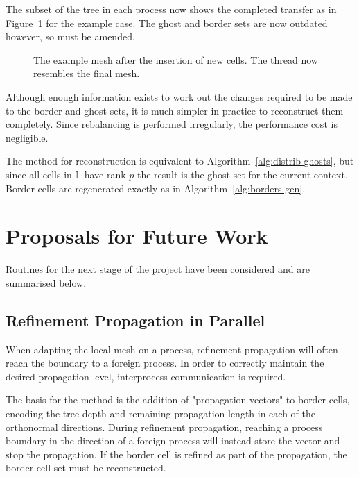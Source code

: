 \documentclass[twoside]{IIBproject}
\numberwithin{figure}{section}
\begin{document}
            The subset of the tree in each process now shows the completed transfer as in Figure~\ref{fig:rebalance-final} for the example case. The ghost and border sets are now outdated however, so must be amended.

            \begin{figure}[!htbp]
                
                \caption{The example mesh after the insertion of new cells. The thread now resembles the final mesh.}
                \label{fig:rebalance-final}
            \end{figure}

            Although enough information exists to work out the changes required to be made to the border and ghost sets, it is much simpler in practice to reconstruct them completely. Since rebalancing is performed irregularly, the performance cost is negligible.

            The method for reconstruction is equivalent to Algorithm~\ref{alg:distrib-ghosts}, but since all cells in $\mathbb{L}$ have rank $p$ the result is the ghost set for the current context. Border cells are regenerated exactly as in Algorithm~\ref{alg:borders-gen}.





\section{Proposals for Future Work} %
    \label{sec:future-work}

    Routines for the next stage of the project have been considered and are summarised below. 

    \subsection{Refinement Propagation in Parallel} %
        \label{sec:parprop}

        When adapting the local mesh on a process, refinement propagation will often reach the boundary to a foreign process. In order to correctly maintain the desired propagation level, interprocess communication is required. 

        The basis for the method is the addition of "propagation vectors" to border cells, encoding the tree depth and remaining propagation length in each of the orthonormal directions. During refinement propagation, reaching a process boundary in the direction of a foreign process will instead store the vector and stop the propagation. If the border cell is refined as part of the propagation, the border cell set must be reconstructed. 
\end{document}
